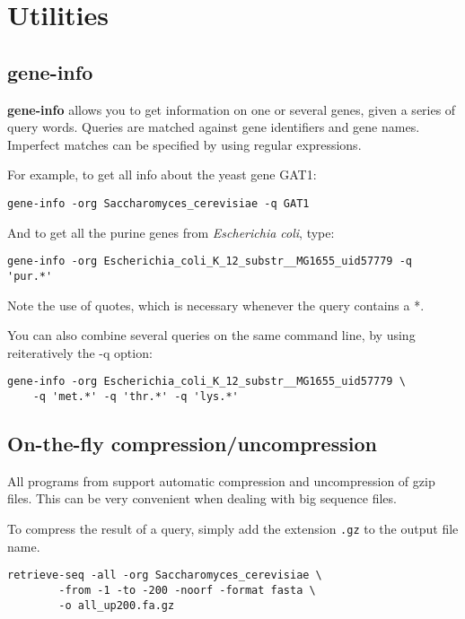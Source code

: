 \chapter{Utilities}

\section{gene-info}

\textbf{gene-info} allows you to get information on one or 
several genes, given a series of query words. Queries are matched
against gene identifiers and gene names. Imperfect matches can be
specified by using regular expressions.

For example, to get all info about the yeast gene GAT1:

\begin{verbatim}
gene-info -org Saccharomyces_cerevisiae -q GAT1
\end{verbatim}

And to get all the purine genes from \textit{Escherichia coli}, type: 

\begin{verbatim}
gene-info -org Escherichia_coli_K_12_substr__MG1655_uid57779 -q 'pur.*'
\end{verbatim}

Note the use of quotes, which is necessary whenever the query contains
a *.

You can also combine several queries on the same command line, by
using reiteratively the -q option:

\begin{verbatim}
gene-info -org Escherichia_coli_K_12_substr__MG1655_uid57779 \
    -q 'met.*' -q 'thr.*' -q 'lys.*'
\end{verbatim}

\section{On-the-fly compression/uncompression}
All programs from \RSAT support automatic compression and
uncompression of gzip files. This can be very convenient when dealing
with big sequence files.

To compress the result of a query, simply add the extension
\texttt{.gz} to the output file name.

\begin{verbatim}
retrieve-seq -all -org Saccharomyces_cerevisiae \
        -from -1 -to -200 -noorf -format fasta \
        -o all_up200.fa.gz
\end{verbatim}

